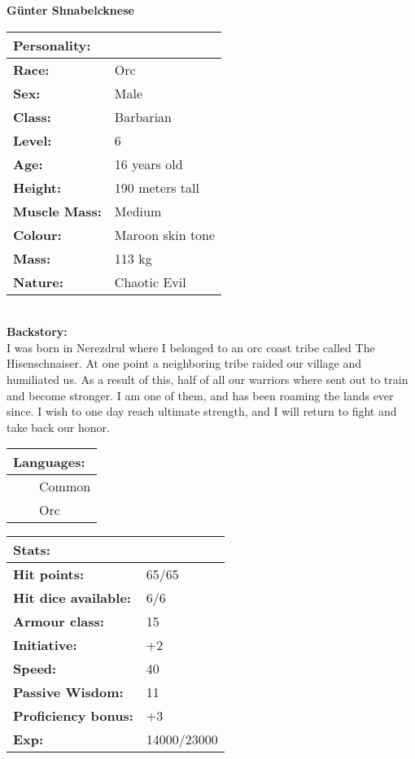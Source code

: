 \documentclass[11pt]{article}
\newcommand{\tabitem}{~~\llap{--}~~}
\begin{document}
	\begin{center}
\Huge \textbf{Günter Shnabelcknese}
	\end{center}
	\begin{multicols}{2}
\noindent \begin{tabularx}{95mm}{@{}l l}
\Large \textbf{Personality:} 	& 						\\
\hline
\textbf{Race:} 					& Orc		 			\\
\textbf{Sex:} 					& Male	 				\\
\textbf{Class:}					& Barbarian				\\
\textbf{Level:} 				& 6						\\
\textbf{Age:} 					& 16 years old			\\
\textbf{Height:} 				& 190 meters tall 		\\
\textbf{Muscle Mass:} 			& Medium 				\\
\textbf{Colour:} 				& Maroon skin tone	 	\\
\textbf{Mass:} 					& 113 kg		 		\\
\textbf{Nature:} 				& Chaotic Evil
		\end{tabularx} \\
\textbf{Backstory:} \\
I was born in Nerezdrul where I belonged to an orc coast tribe called The Hisenschnaiser. At one point a neighboring tribe raided our village and humiliated us. As a result of this, half of all our warriors where sent out to train and become stronger. I am one of them, and has been roaming the lands ever since. I wish to one day reach ultimate strength, and I will return to fight and take back our honor.

\vspace{4mm}

\noindent \begin{tabularx}{95mm}{@{}l}
{\Large \textbf{Languages:}} \\
\hline
\tabitem Common \\
\tabitem Orc \\
		\end{tabularx}

\vspace{4mm}

\noindent \begin{tabularx}{95mm}{@{}l l}
\Large \textbf{Stats:}		 	& 									\\
\hline
\textbf{Hit points:} 			& 65/65  							\\
\textbf{Hit dice available:}	& 6/6								\\
\textbf{Armour class:} 			& 15							 	\\
\textbf{Initiative:} 			& +2								\\
\textbf{Speed:} 				& 40	 							\\
\textbf{Passive Wisdom:} 		& 11			 					\\
\textbf{Proficiency bonus:}		& +3								\\
\textbf{Exp:} 					& 14000/23000
		\end{tabularx}


\end{multicols}
\end{document}
